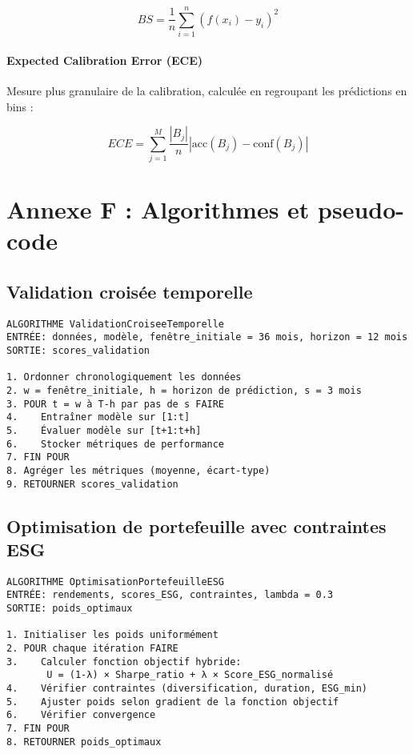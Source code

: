 \begin{equation}
BS = \frac{1}{n} \sum_{i=1}^{n} (f(x_i) - y_i)^2
\end{equation}

\paragraph{Expected Calibration Error (ECE)}
Mesure plus granulaire de la calibration, calculée en regroupant les prédictions en bins :

\begin{equation}
ECE = \sum_{j=1}^{M} \frac{|B_j|}{n} |\text{acc}(B_j) - \text{conf}(B_j)|
\end{equation}

\section{Annexe F : Algorithmes et pseudo-code}

\subsection{Validation croisée temporelle}

\begin{verbatim}
ALGORITHME ValidationCroiseeTemporelle
ENTRÉE: données, modèle, fenêtre_initiale = 36 mois, horizon = 12 mois
SORTIE: scores_validation

1. Ordonner chronologiquement les données
2. w = fenêtre_initiale, h = horizon de prédiction, s = 3 mois
3. POUR t = w à T-h par pas de s FAIRE
4.    Entraîner modèle sur [1:t]
5.    Évaluer modèle sur [t+1:t+h]
6.    Stocker métriques de performance
7. FIN POUR
8. Agréger les métriques (moyenne, écart-type)
9. RETOURNER scores_validation
\end{verbatim}

\subsection{Optimisation de portefeuille avec contraintes ESG}

\begin{verbatim}
ALGORITHME OptimisationPortefeuilleESG
ENTRÉE: rendements, scores_ESG, contraintes, lambda = 0.3
SORTIE: poids_optimaux

1. Initialiser les poids uniformément
2. POUR chaque itération FAIRE
3.    Calculer fonction objectif hybride:
       U = (1-λ) × Sharpe_ratio + λ × Score_ESG_normalisé
4.    Vérifier contraintes (diversification, duration, ESG_min)
5.    Ajuster poids selon gradient de la fonction objectif
6.    Vérifier convergence
7. FIN POUR
8. RETOURNER poids_optimaux
\end{verbatim}

